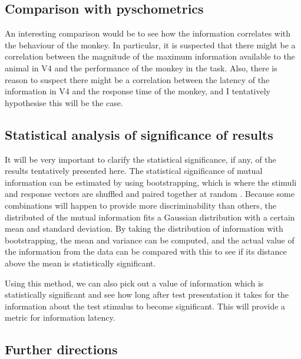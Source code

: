 \subsection{Comparison with pyschometrics}

An interesting comparison would be to see how the information correlates with the behaviour of the monkey.
In particular, it is suspected that there might be a correlation between the magnitude of the maximum information available to the animal in V4 and the performance of the monkey in the task.
Also, there is reason to suspect there might be a correlation between the latency of the information in V4 and the response time of the monkey, and I tentatively hypothesise this will be the case.

\subsection{Statistical analysis of significance of results}

It will be very important to clarify the statistical significance, if any, of the results tentatively presented here.
The statistical significance of mutual information can be estimated by using bootstrapping, which is where the stimuli and response vectors are shuffled and paired together at random \cite{Ince2011}. Because some combinations will happen to provide more discriminability than others, the distributed of the mutual information fits a Gaussian distribution with a certain mean and standard deviation. By taking the distribution of information with bootstrapping, the mean and variance can be computed, and the actual value of the information from the data can be compared with this to see if its distance above the mean is statistically significant.

Using this method, we can also pick out a value of information which is statistically significant and see how long after test presentation it takes for the information about the test stimulus to become significant. This will provide a metric for information latency.

\subsection{Further directions}

